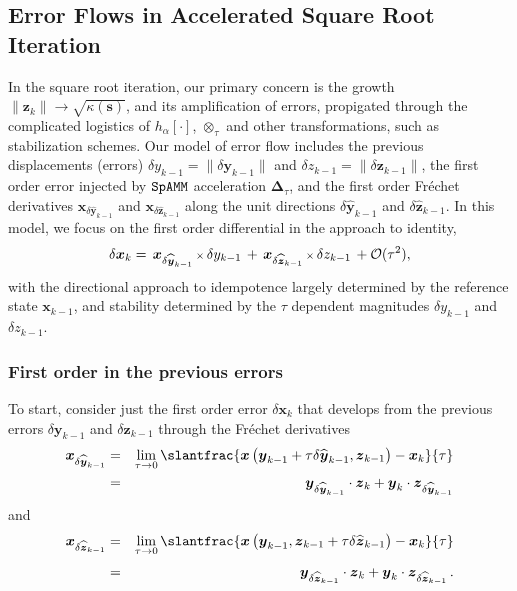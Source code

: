 \documentclass[letterpaper,twocolumn,amsmath,amsfont,amssymb,english,aps,jcp,preprintnumbers,groupaddress,nofootinbib,tightenlines]{revtex4}
\newcommand{\mat}[1]{\boldsymbol{#1}}
\newcommand{\ot}{ {\scriptstyle \otimes}_{ \tau } }
\begin{document}
\pagebreak

\subsection{Error Flows in Accelerated Square Root Iteration}

In the square root iteration, our primary concern is the growth
$\lVert \mat{z}_{k} \rVert  \rightarrow \sqrt{\kappa\left(\mat{s} \right)}$,
and its amplification of errors, propigated through the complicated logistics of $h_\alpha[\cdot]$,
$\ot$ and other transformations, such as stabilization schemes.   Our model of error flow
includes the previous displacements (errors) $\delta y_{k-1} = \lVert \delta \mat{y}_{k-1} \rVert$  and  $\delta z_{k-1}=\lVert \delta \mat{z}_{k-1} \rVert$,
the first order error injected by $\tt SpAMM$ acceleration $\mat{\Delta}_\tau$,  and the first order
Fr\'{e}chet derivatives \cite{} ${\mat{x}}_{\delta \widehat{\mat{y}}_{k-1}}$ and ${\mat{x}}_{\delta \widehat{ \mat{z}}_{k-1}}$
along the unit directions  $\delta \widehat{\mat{y}}_{k-1}$ and $\delta \widehat{\mat{z}}_{k-1}$.
In this model, we focus on the first order differential in the approach to identity,
\begin{equation} \label{firstorder}
\delta \mat{x}_k = \,  { \mat{x}}_{\delta \widehat{\mat{y}}_{k-1}}  \, {\scriptstyle \times} \, \delta y_{k-1}
                 \, + \,  { \mat{x}}_{\delta \widehat{\mat{z}}_{k-1}}  \, {\scriptstyle \times} \, \delta z_{k-1}  \, + {\cal O}(\tau^2) ,
\end{equation}
with the directional approach to idempotence largely determined by the reference state $\mat{x}_{k-1}$, and stability determined by
the $\tau$ dependent magnitudes $\delta y_{k-1}$  and $\delta z_{k-1}$.

\subsubsection{First order in the previous errors}

To start, consider just the first order error $\delta \mat{x}_k$ that develops from the previous errors $\delta \mat{y}_{k-1}$
and $\delta \mat{z}_{k-1}$ through the Fr\'{e}chet derivatives \cite{}
\begin{eqnarray}
  \mat{x}_{\delta \widehat{ \mat{y}}_{k-1}}
&=& \lim_{\tau \rightarrow 0} \slantfrac{ \mat{x} \left( \mat{y}_{k-1} + \tau \delta \widehat{\mat{y}}_{k-1} ,  {\mat{z}}_{k-1}  \right)
                                     -\mat{x}_k    }{\tau}  \nonumber  \\
&=&   \mat{y}_{\delta \widehat{ \mat{y}}_{k-1}} \cdot \mat{z}_{k}  + \mat{y}_{k}  \cdot \mat{z}_{\delta \widehat{ \mat{y}}_{k-1}}
 \end{eqnarray}
and
 \begin{eqnarray}
 \mat{x}_{\delta \widehat{ \mat{z}}_{k-1}} &=& \lim_{\tau \rightarrow 0}
\slantfrac{ \mat{x} \left( {\mat{y}}_{k-1} , \mat{z}_{k-1} +\tau  \delta \widehat{\mat{z}}_{k-1} \right) - \mat{x}_k   }{\tau} \nonumber  \\[0.1cm]
&=& \mat{y}_{\delta \widehat{ \mat{z}}_{k-1}} \cdot \mat{z}_{k}  + \mat{y}_{k}  \cdot \mat{z}_{\delta \widehat{ \mat{z}}_{k-1}} \, .
 \end{eqnarray}
\end{document}
